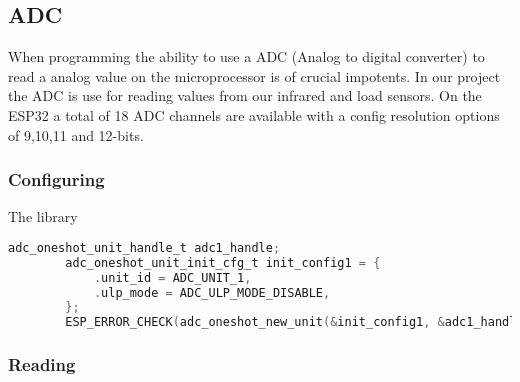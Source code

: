 \documentclass[../report.tex]{subfiles}
\begin{document}
    \subsection{ADC}
    When programming the ability to use a ADC (Analog to digital converter) to
    read a analog value on the microprocessor is of crucial impotents. In our
    project the ADC is use for reading values from our infrared and load
    sensors. On the ESP32 a total of 18 ADC channels are available with a config
    resolution options of 9,10,11 and 12-bits.
    \subsubsection{Configuring}
    The library
    \begin{lstlisting}[language=c]
        adc_oneshot_unit_handle_t adc1_handle;
        adc_oneshot_unit_init_cfg_t init_config1 = {
            .unit_id = ADC_UNIT_1,
            .ulp_mode = ADC_ULP_MODE_DISABLE,
        };
        ESP_ERROR_CHECK(adc_oneshot_new_unit(&init_config1, &adc1_handle));
    \end{lstlisting}
    \subsubsection{Reading}
    
\end{document}
